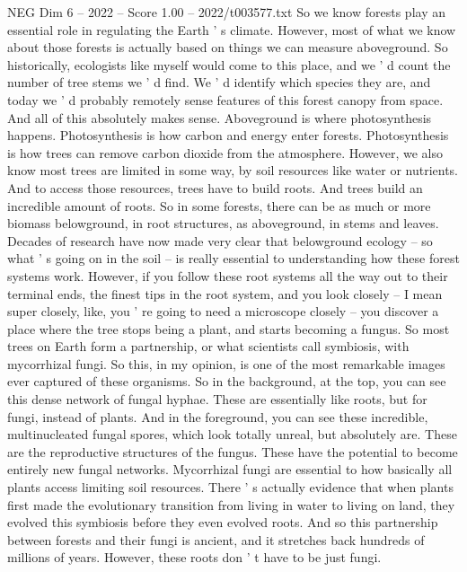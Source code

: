 \begin{textsample}{NEG Dim 6 – 2022 – Score 1.00 – 2022/t003577.txt}  \label{ex:f6_neg_011}
So we know forests play an essential role in regulating the Earth ' s climate.
However, most of what we know about those forests is actually based on things we can measure aboveground.
So historically, ecologists like myself would come to this place, and we ' d count the number of tree stems we ' d find.
We ' d identify which species they are, and today we ' d probably remotely sense features of this forest canopy from space.
And all of this absolutely makes sense.
Aboveground is where photosynthesis happens.
Photosynthesis is how carbon and energy enter forests.
Photosynthesis is how trees can remove carbon dioxide from the atmosphere.
However, we also know most trees are limited in some way, by soil resources like water or nutrients.
And to access those resources, trees have to build roots.
And trees build an incredible amount of roots.
So in some forests, there can be as much or more biomass belowground, in root structures, as aboveground, in stems and leaves.
Decades of research have now made very clear that belowground ecology -- so what ' s going on in the soil -- is really essential to understanding how these forest systems work.
However, if you follow these root systems all the way out to their terminal ends, the finest tips in the root system, and you look closely -- I mean super closely, like, you ' re going to need a microscope closely -- you discover a place where the tree stops being a plant, and starts becoming a fungus.
So most trees on Earth form a partnership, or what scientists call symbiosis, with mycorrhizal fungi.
So this, in my opinion, is one of the most remarkable images ever captured of these organisms.
So in the background, at the top, you can see this dense network of fungal hyphae.
These are essentially like roots, but for fungi, instead of plants.
And in the foreground, you can see these incredible, multinucleated fungal spores, which look totally unreal, but absolutely are.
These are the reproductive structures of the fungus.
These have the potential to become entirely new fungal networks.
Mycorrhizal fungi are essential to how basically all plants access limiting soil resources.
There ' s actually evidence that when plants first made the evolutionary transition from living in water to living on land, they evolved this symbiosis before they even evolved roots.
And so this partnership between forests and their fungi is ancient, and it stretches back hundreds of millions of years.
However, these roots don ' t have to be just fungi.

\end{textsample}
